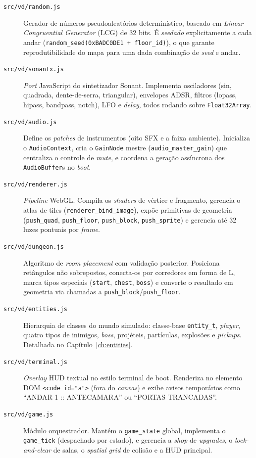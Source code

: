 \begin{description}

  \item[\texttt{src/vd/random.js}] Gerador de números pseudoaleatórios determinístico,
    baseado em \emph{Linear Congruential Generator} (LCG) de 32 bits. É \emph{seedado}
    explicitamente a cada andar (\texttt{random\_seed(0xBADC0DE1 + floor\_id)}), o que
    garante reprodutibilidade do mapa para uma dada combinação de \emph{seed} e andar.

  \item[\texttt{src/vd/sonantx.js}] \emph{Port} JavaScript do sintetizador Sonant.
    Implementa osciladores (sin, quadrada, dente-de-serra, triangular), envelopes ADSR,
    filtros (lopass, hipass, bandpass, notch), LFO e \emph{delay}, todos rodando sobre
    \texttt{Float32Array}.

  \item[\texttt{src/vd/audio.js}] Define os \emph{patches} de instrumentos (oito SFX e a
    faixa ambiente). Inicializa o \texttt{AudioContext}, cria o \texttt{GainNode} mestre
    (\texttt{audio\_master\_gain}) que centraliza o controle de \emph{mute}, e coordena
    a geração assíncrona dos \texttt{AudioBuffer}s no \emph{boot}.

  \item[\texttt{src/vd/renderer.js}] \textit{Pipeline} WebGL. Compila os \emph{shaders}
    de vértice e fragmento, gerencia o atlas de tiles (\texttt{renderer\_bind\_image}),
    expõe primitivas de geometria (\texttt{push\_quad}, \texttt{push\_floor},
    \texttt{push\_block}, \texttt{push\_sprite}) e gerencia até 32 luzes pontuais por
    \emph{frame}.

  \item[\texttt{src/vd/dungeon.js}] Algoritmo de \emph{room placement} com validação
    posterior. Posiciona retângulos não sobrepostos, conecta-os por corredores em forma
    de L, marca tipos especiais (\texttt{start}, \texttt{chest}, \texttt{boss}) e
    converte o resultado em geometria via chamadas a
    \texttt{push\_block}/\texttt{push\_floor}.

  \item[\texttt{src/vd/entities.js}] Hierarquia de classes do mundo simulado:
    classe-base \texttt{entity\_t}, \emph{player}, quatro tipos de inimigos,
    \emph{boss}, projéteis, partículas, explosões e \emph{pickups}. Detalhada no
    Capítulo~\ref{ch:entities}.

  \item[\texttt{src/vd/terminal.js}] \emph{Overlay} HUD textual no estilo terminal de
    boot. Renderiza no elemento DOM \texttt{<code id="a">} (fora do \emph{canvas}) e
    exibe avisos temporários como ``ANDAR 1 :: ANTECAMARA'' ou ``PORTAS TRANCADAS''.

  \item[\texttt{src/vd/game.js}] Módulo orquestrador. Mantém o \texttt{game\_state}
    global, implementa o \texttt{game\_tick} (despachado por estado), e gerencia a
    \emph{shop} de \emph{upgrades}, o \emph{lock-and-clear} de salas, o \emph{spatial
    grid} de colisão e a HUD principal.

\end{description}

